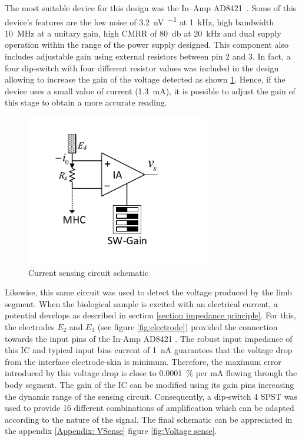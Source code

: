 The most suitable device for this design was the In–Amp AD8421~\cite{ad:AD8421}. Some of this device's features are the low noise of \SI{3.2}{\nano\volt\per{}} at \SI{1}{\kHz}, high bandwidth \SI{10}{\mega\hertz} at a unitary gain, high CMRR of \SI{80}{\decibel} at \SI{20}{\kHz} and dual supply operation within the range of the power supply designed. This component also includes adjustable gain using external resistors between pin 2 and 3. In fact, a four dip-switch with four different resistor values was included in the design allowing to increase the gain of the voltage detected as shown \ref{fig:peak}. Hence, if the device uses a small value of current (\SI{1.3}{\mA}), it is possible to adjust the gain of this stage to obtain a more accurate reading.

\begin{figure}[!htpb]
	\centering
	\includegraphics[width=8cm,keepaspectratio]{figure4}
	\caption{Current sensing circuit schematic}
	\label{fig:peak}
\end{figure}

Likewise, this same circuit was used to detect the voltage produced by the limb segment. When the biological sample is excited with an electrical current, a potential develops as described in section \ref{section impedance principle}. For this, the electrodes $E_2$ and $E_3$ (see figure \ref{fig:electrode}) provided the connection towards the input pins of the In-Amp AD8421 \cite{ad:AD8421}. The robust input impedance of this IC and typical input bias current of \SI{1}{\nA} guarantees that the voltage drop from the interface electrode-skin is minimum. Therefore, the maximum error introduced by this voltage drop is close to \SI{0.0001}{\percent} per mA flowing through the body segment. The gain of the IC can be modified using its gain pins increasing the dynamic range of the sensing circuit. Consequently, a dip-switch 4 SPST was used to provide 16 different combinations of amplification which can be adapted according to the nature of the signal. The final schematic can be appreciated in the appendix \ref{Appendix: VSense} figure \ref{fig:Voltage sense}.

